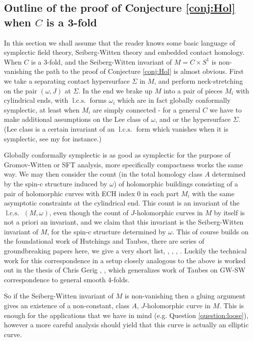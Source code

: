 \documentclass{amsart}
\numberwithin{equation}{section}
\theoremstyle{definition}
\theoremstyle{remark}
\DeclareMathOperator{\lcs}{l.c.s.}
\begin{document}
\subsection {Outline of the proof of Conjecture \ref{conj:Hol} when $C$ is a 3-fold}
In this section we shall assume that the reader knows some basic language of symplectic field theory, Seiberg-Witten theory and embedded contact homology. When $C$ is a 3-fold, and the Seiberg-Witten invariant of $M = C \times S ^{1} $ is non-vanishing the path to the proof of Conjecture \ref{conj:Hol} is almost obvious. First we take a separating contact hypersurface $\Sigma$ in $M$, and perform neck-stretching on the pair $(\omega, J)$ at $\Sigma$. In the end we brake up $M$ into a pair of pieces $M _{i} $ with cylindrical ends, with $\lcs$ forms $\omega _{i} $ which are in fact globally conformally symplectic,  at least when $M _{i} $ are simply connected - for a general $C$ we have to make additional assumptions on the Lee class of $\omega$, and or the hypersurface $\Sigma$. (Lee class is a certain invariant of an $\lcs$ form which vanishes when it is symplectic, see my \cite{citeSavelyevConformalSymplectic} for instance.)


Globally conformally symplectic is as good as symplectic for the purpose of Gromov-Witten or SFT analysis, more specifically compactness works the same way.
We may then consider the count (in the total homology class $A$ determined by the spin-c structure induced by $\omega$) of holomorphic buildings consisting of a pair of holomorphic curves with ECH index 0 in each part $M _{i} $ 
with the same asymptotic constraints at the cylindrical end. This count  is an invariant of the $\lcs$ $(M,\omega)$, even though the count of $J$-holomorphic curves in $M$ by itself is not a priori an invariant, and we claim that this invariant is the Seiberg-Witten invariant of $M$, for the spin-c structure determined by $\omega$.
This of course builds on the foundational work of Hutchings and Taubes, there are series of groundbreaking papers here, we give a very short list, \cite{citeHutchingsECHindex}, \cite{citeHutchingsSullivanRoundingCorners}, \cite{citeTaubesCountingPseudoHolomorphic}, \cite{citeTaubesWeinsteinconjecture}.
Luckily the technical work for this correspondence in a setup closely analogous to the above is worked out in the thesis of Chris Gerig \cite{citeGerigChrisTaming}, \cite{citeGerigChrisSW}, which generalizes work of Taubes on GW-SW correspondence to general smooth 4-folds.
 
So if the Seiberg-Witten invariant of $M$ is non-vanishing then a gluing argument gives an existence of a non-constant, class $A$, $J$-holomorphic curve in $M$. This is enough for the applications that we have in mind (e.g.
Question \ref{question:loose}), however a more careful analysis should yield that this curve is actually an elliptic curve.
\end{document}
